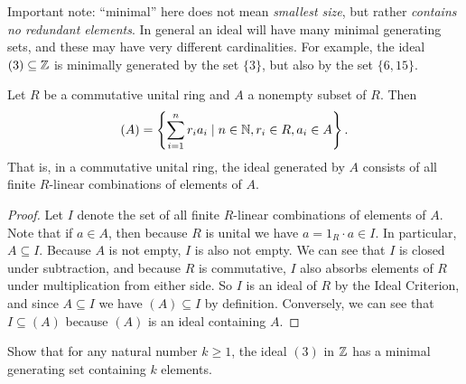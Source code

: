 Important note: ``minimal'' here does not mean \emph{smallest size}, but rather \emph{contains no redundant elements}.
In general an ideal will have many minimal generating sets, and these may have very different cardinalities.
For example, the ideal \((3) \subseteq \mathbb{Z}\) is minimally generated by the set \(\{3\}\), but also by the set \(\{6,15\}\).

\begin{prop}
Let \(R\) be a commutative unital ring and \(A\) a nonempty subset of \(R\).
Then \[ (A) = \left\{ \sum_{i=1}^n r_ia_i \mid n \in \mathbb{N}, r_i \in R, a_i \in A \right\}. \]
That is, in a commutative unital ring, the ideal generated by \(A\) consists of all finite \(R\)-linear combinations of elements of \(A\).
\end{prop}

\begin{proof}
Let \(I\) denote the set of all finite \(R\)-linear combinations of elements of \(A\).
Note that if \(a \in A\), then because \(R\) is unital we have \(a = 1_R \cdot a \in I\).
In particular, \(A \subseteq I\).
Because \(A\) is not empty, \(I\) is also not empty.
We can see that \(I\) is closed under subtraction, and because \(R\) is commutative, \(I\) also absorbs elements of \(R\) under multiplication from either side.
So \(I\) is an ideal of \(R\) by the Ideal Criterion, and since \(A \subseteq I\) we have \((A) \subseteq I\) by definition.
Conversely, we can see that \(I \subseteq (A)\) because \((A)\) is an ideal containing \(A\).
\end{proof}



\Exercises%

\begin{exercise}
Show that for any natural number \(k \geq 1\), the ideal \((3)\) in \(\mathbb{Z}\) has a minimal generating set containing \(k\) elements.
\end{exercise}
